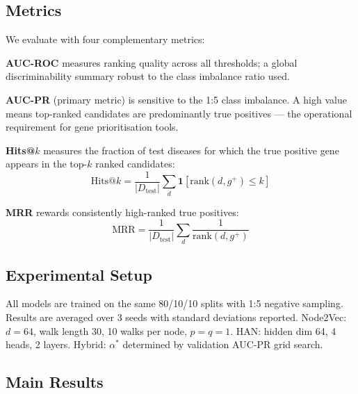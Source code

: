 \documentclass[10pt,a4paper,twocolumn]{article}
\begin{document}
\subsection{Metrics}

We evaluate with four complementary metrics:

\textbf{AUC-ROC} measures ranking quality across all thresholds; a global
discriminability summary robust to the class imbalance ratio used.

\textbf{AUC-PR} (primary metric) is sensitive to the 1:5 class imbalance.
A high value means top-ranked candidates are predominantly true positives ---
the operational requirement for gene prioritisation tools.

\textbf{Hits@$k$} measures the fraction of test diseases for which the true
positive gene appears in the top-$k$ ranked candidates:
\begin{equation}
\text{Hits@}k = \frac{1}{|D_\text{test}|} \sum_{d} \mathbf{1}[\text{rank}(d,g^+) \leq k]
\end{equation}

\textbf{MRR} rewards consistently high-ranked true positives:
\begin{equation}
\text{MRR} = \frac{1}{|D_\text{test}|} \sum_{d} \frac{1}{\text{rank}(d,g^+)}
\end{equation}

\subsection{Experimental Setup}

All models are trained on the same 80/10/10 splits with 1:5 negative sampling.
Results are averaged over 3 seeds with standard deviations reported.
Node2Vec: $d=64$, walk length 30, 10 walks per node, $p=q=1$. HAN: hidden
dim 64, 4 heads, 2 layers. Hybrid: $\alpha^*$ determined by validation AUC-PR
grid search.

\subsection{Main Results}
\end{document}
